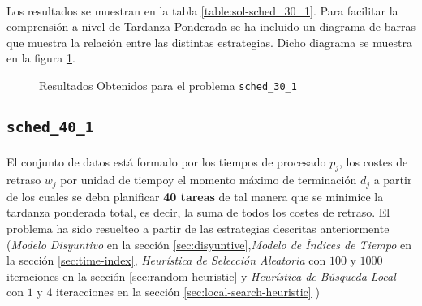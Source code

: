 \documentclass[spanish]{article}
\begin{document}
			\paragraph{}
			Los resultados se muestran en la tabla \ref{table:sol-sched_30_1}. Para facilitar la comprensión a nivel de Tardanza Ponderada se ha incluido un diagrama de barras que muestra la relación entre las distintas estrategias. Dicho diagrama se muestra en la figura \ref{plot:sol-sched_30_1}.


			\begin{figure}
				\begin{center}
				\end{center}
				\caption{Resultados Obtenidos para el problema \texttt{sched\_30\_1}}
				\label{plot:sol-sched_30_1}
			\end{figure}

		\subsection{\texttt{sched\_40\_1}}

			\paragraph{}
			El conjunto de datos está formado por los tiempos de procesado $p_j$, los costes de retraso $w_j$ por unidad de tiempoy el momento máximo de terminación $d_j$ a partir de los cuales se debn planificar \textbf{40 tareas} de tal manera que se minimice la tardanza ponderada total, es decir, la suma de todos los costes de retraso. El problema ha sido resuelteo a partir de las estrategias descritas anteriormente (\emph{Modelo Disyuntivo} en la sección \ref{sec:disyuntive},\emph{Modelo de Índices de Tiempo} en la sección \ref{sec:time-index}, \emph{Heurística de Selección Aleatoria} con $100$ y $1000$ iteraciones en la sección \ref{sec:random-heuristic} y \emph{Heurística de Búsqueda Local} con $1$ y $4$ iteracciones en la sección \ref{sec:local-search-heuristic} )
\end{document}
